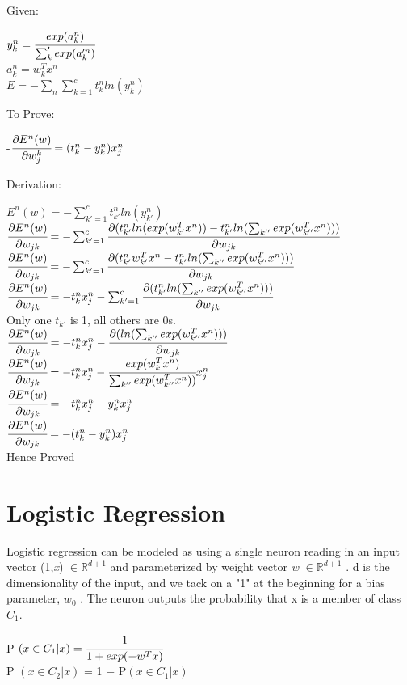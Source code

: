 \documentclass{article} %
\begin{document}
Given:
\begin{center}
	$y_k^n = \cfrac{exp(a_{k}^n)}{\sum_k' exp(a_k'^n)}$\\
    \hfill\break
$a_{k}^n = w_k^T x^n$\\
\hfill\break
$E = −\sum_n \sum_{k=1}^{c} t^n_k ln(y_k^n)$
\end{center}
To Prove:
\begin{center}
    -$\cfrac{\partial E^n(w)}{\partial w_j^k} = (t^n_k-y^n_k)x^n_j $\break\hfill
\end{center}
Derivation:
\begin{center}
$E^n(w) = -\sum_{k'=1}^{c} t^n_{k'} ln(y_{k'}^n)$\\
\hfill\break
\hfill\break
$\cfrac{\partial E^n(w)}{\partial w_{jk}} = -\sum_{k'=1}^{c}\cfrac{\partial(t^n_{k'}ln(exp(w_{k'}^Tx^n))-t^n_{k'}ln(\sum_{k''}exp(w_{k''}^Tx^n)))}{\partial w_{jk}}$\\
	\hfill\break
    \hfill\break
$\cfrac{\partial E^n(w)}{\partial w_{jk}} = -\sum_{k'=1}^{c}\cfrac{\partial(t^n_{k'}w_{k'}^Tx^n-t^n_{k'}ln(\sum_{k''}exp(w_{k''}^Tx^n)))}{\partial w_{jk}}$\\
    \hfill\break
    \hfill\break
$\cfrac{\partial E^n(w)}{\partial w_{jk}} = -t^n_kx^n_j-\sum_{k'=1}^{c}\cfrac{\partial (t^n_{k'}ln(\sum_{k''}exp(w_{k''}^Tx^n)))}{\partial w_{jk}}$\\
    \hfill\break
    \hfill\break
   Only one $t_{k'}$ is 1, all others are 0s.\\
    \hfill\break
 $\cfrac{\partial E^n(w)}{\partial w_{jk}} = -t^n_kx^n_j-\cfrac{\partial (ln(\sum_{k''}exp(w_{k''}^Tx^n)))}{\partial w_{jk}}$\\
    \hfill\break
$\cfrac{\partial E^n(w)}{\partial w_{jk}} = -t^n_kx^n_j-\cfrac{exp(w_k^Tx^n)}{\sum_{k''}exp(w_{k''}^Tx^n))}x^n_j$\\
    \hfill\break
    \hfill\break
$\cfrac{\partial E^n(w)}{\partial w_{jk}} = -t^n_kx^n_j-y_k^nx^n_j$\\
    \hfill\break
    \hfill\break
$\cfrac{\partial E^n(w)}{\partial w_{jk}} = -(t^n_k-y_k^n)x^n_j$\\
    \hfill\break
    Hence Proved 

\end{center}

\section{Logistic Regression}
Logistic regression can be modeled as using a single neuron reading in an input vector (1,{\sl x}) $\in \mathbb{R}^{d+1}$ and parameterized by weight vector {\sl w} $\in \mathbb{R}^{d+1}$ . d is the dimensionality of the input, and we tack on a "1" at the beginning for a bias parameter, $w_0$ . The neuron outputs the probability that x is a member of class $C_1$.\\
\begin{center}
P $(x \in C_1 |x) = \cfrac{1}{1+exp(-w^T x)}$\\
\hfill\break
\hfill\break
P $(x \in C_2 |x)$ = 1 − P$(x \in C_1 |x)$\\
\hfill\break
\end{center}
\end{document}
